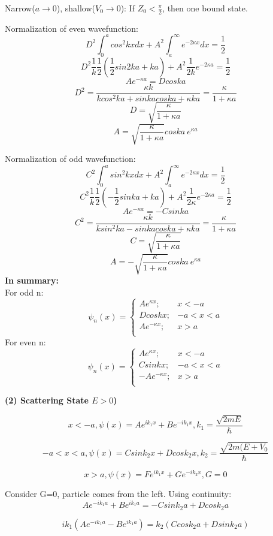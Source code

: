 \documentclass[12pt,a4paper]{article}
\begin{document}
Narrow($a \to 0$), shallow($V_0 \to 0$): If $Z_0 < \frac{\pi}{2}$, then one bound state.

Normalization of even wavefunction:
\[
D^2 \int _0 ^a cos^2 kxdx+ A^2 \int _a ^\infty e^{-2\kappa x} dx = \frac{1}{2}
\]
\[
D^2 \frac{1}{k} \frac{1}{2}(\frac{1}{2}sin2ka+ka)+A^2 \frac{1}{2k} e^{-2 \kappa a}=\frac{1}{2}
\]
\[
Ae^{-\kappa a}=Dcoska
\]
\[
D^2 = \frac{\kappa k}{kcos^2 ka+ sinkacoska+\kappa ka}=\frac{\kappa}{1+\kappa a}
\]
\[
D=\sqrt{\frac{\kappa}{1+\kappa a}}
\]
\[
A=\sqrt{\frac{\kappa}{1+\kappa a}} coska \ e^{\kappa a}
\]

Normalization of odd wavefunction:
\[
C^2 \int _0 ^a sin^2 kx dx + A^2 \int _a ^{\infty} e^{-2\kappa x} dx=\frac{1}{2}
\]
\[
C^2 \frac{1}{k}\frac{1}{2}(-\frac{1}{2}sinka+ka)+A^2 \frac{1}{2\kappa}e^{-2\kappa a}=\frac{1}{2}
\]
\[
Ae^{-\kappa a}=-Csinka
\]
\[
C^2 = \frac{\kappa k}{ksin^2 ka- sinkacoska+\kappa ka}=\frac{\kappa}{1+\kappa a}
\]
\[
C=\sqrt{\frac{\kappa}{1+\kappa a}}
\]
\[
A=-\sqrt{\frac{\kappa}{1+\kappa a}} coska \ e^{\kappa a}
\]
\textbf{In summary:}\\

For odd n:
\[
\psi _n (x)= \begin{cases}
              Ae^{\kappa x} ; &  x<-a \\
              Dcoskx;      & -a<x<a \\
              Ae^{-\kappa x};      & x>a \\
         \end{cases}
\]
For even n:
\[
\psi _n (x)= \begin{cases}
              Ae^{\kappa x} ; &  x<-a \\
              Csinkx;      & -a<x<a \\
              -Ae^{-\kappa x};      & x>a \\
         \end{cases}
\]

\textbf{(2) Scattering State $E>0$)}

\[
x<-a, \psi (x)=Ae^{i k_1 x} + Be^{-i k_1 x},k_1 =\frac{\sqrt{2mE}}{\hbar}
\]

\[
-a<x<a, \psi (x)=Csin k_2 x + D cos k_2 x,k_2 =\frac{\sqrt{2m(E+V_0}}{\hbar}
\]

\[
x>a, \psi (x)=Fe^{i k_1 x} + Ge^{-i k_2 x},G=0
\]

Consider G=0, particle comes from the left. Using continuity:
\[
Ae^{-ik_1 a} + Be^{i k_1 a}= -Csin k_2 a+Dcos k_2 a
\]

\[
ik_1 (Ae^{-i k_1 a} - B e^{i k_1 a})=k_2 (Ccos k_2 a + D sin k_2 a)
\]
\end{document}
